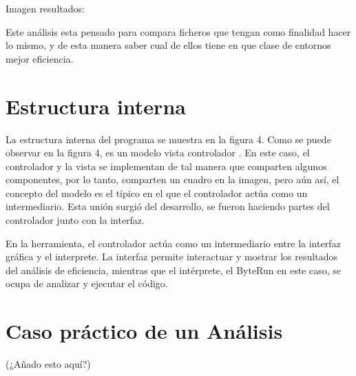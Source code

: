 Imagen resultados:

Este análisis esta pensado para compara ficheros que tengan como finalidad hacer lo mismo, y de esta manera saber cual de ellos tiene en que clase de entornos mejor eficiencia.

\section{Estructura interna}


La estructura interna del programa se muestra en la figura 4. Como se puede observar en la figura 4, es un modelo vista controlador . En este caso, el controlador y la vista se implementan de tal manera que comparten algunos componentes, por lo tanto, comparten un cuadro en la imagen, pero aún así, el concepto del modelo es el típico en el que el controlador actúa como un intermediario. Esta unión surgió del desarrollo, se fueron haciendo partes del controlador junto con la interfaz.

En la herramienta, el controlador actúa como un intermediario entre la interfaz gráfica y el interprete. La interfaz permite interactuar y mostrar los resultados del análisis de eficiencia, mientras que el intérprete, el ByteRun en este caso, se ocupa de analizar y ejecutar el código.

\section{Caso práctico de un Análisis}
(¿Añado esto aquí?)